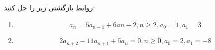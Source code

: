 \EXERCISE
روابط بازگشتی زیر را حل کنید:
\begin{enumerate}
\item
$$a_n = 5a_{n-1} + 6a{n-2}, n \geq 2, a_0 = 1, a_1 = 3$$
\item
$$2a_{n+2} - 11a_{n+1} + 5a_n = 0, n \geq 0, a_0 = 2, a_1 = -8$$
\end{enumerate}